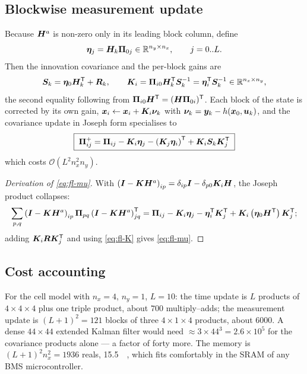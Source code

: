 \subsection{Blockwise measurement update}
Because $\bm{H}^a$ is non-zero only in its leading block column, define
\begin{equation}
\bm{\eta}_j=\bm{H}_k\bm{\Pi}_{0j}\in\mathbb{R}^{n_y\times n_x},\qquad j=0..L .
\label{eq:fl-eta}
\end{equation}
Then the innovation covariance and the per-block gains are
\begin{equation}
\bm{S}_k=\bm{\eta}_0\bm{H}_k^{\mathsf{T}}+\bm{R}_k,
\qquad
\bm{K}_i=\bm{\Pi}_{i0}\bm{H}_k^{\mathsf{T}}\bm{S}_k^{-1}=\bm{\eta}_i^{\mathsf{T}}\bm{S}_k^{-1}\in\mathbb{R}^{n_x\times n_y},
\label{eq:fl-K}
\end{equation}
the second equality following from $\bm{\Pi}_{i0}\bm{H}^{\mathsf{T}}=(\bm{H}\bm{\Pi}_{0i})^{\mathsf{T}}$.  Each block of the
state is corrected by its own gain, $\bm{x}_i\leftarrow\bm{x}_i+\bm{K}_i\bm{\nu}_k$ with
$\bm{\nu}_k=\bm{y}_k-h(\bm{x}_0,\bm{u}_k)$, and the covariance update in Joseph form specialises to
\begin{equation}
\boxed{\;\bm{\Pi}^+_{ij}=\bm{\Pi}_{ij}-\bm{K}_i\bm{\eta}_j-\left(\bm{K}_j\bm{\eta}_i\right)^{\mathsf{T}}+\bm{K}_i\bm{S}_k\bm{K}_j^{\mathsf{T}}\;}
\label{eq:fl-mu}
\end{equation}
which costs $\mathcal{O}(L^2n_x^2n_y)$.
\begin{proof}[Derivation of \eqref{eq:fl-mu}]
With $\left(\bm{I}-\bm{K}\bm{H}^a\right)_{ip}=\delta_{ip}\bm{I}-\delta_{p0}\bm{K}_i\bm{H}$, the Joseph product
collapses:
\[
\sum_{p,q}\left(\bm{I}-\bm{K}\bm{H}^a\right)_{ip}\bm{\Pi}_{pq}\left(\bm{I}-\bm{K}\bm{H}^a\right)_{jq}^{\mathsf{T}}
=\bm{\Pi}_{ij}-\bm{K}_i\bm{\eta}_j-\bm{\eta}_i^{\mathsf{T}}\bm{K}_j^{\mathsf{T}}+\bm{K}_i\left(\bm{\eta}_0\bm{H}^{\mathsf{T}}\right)\bm{K}_j^{\mathsf{T}} ;
\]
adding $\bm{K}_i\bm{R}\bm{K}_j^{\mathsf{T}}$ and using \eqref{eq:fl-K} gives \eqref{eq:fl-mu}.
\end{proof}

\subsection{Cost accounting}
For the cell model with $n_x=4$, $n_y=1$, $L=10$: the time update is $L$ products of
$4\times4\times4$ plus one triple product, about $700$ multiply--adds; the measurement update is
$(L+1)^2=121$ blocks of three $4\times1\times4$ products, about $6000$.  A dense $44\times44$
extended Kalman filter would need $\approx3\times44^3=2.6\times10^5$ for the covariance products
alone --- a factor of forty more.  The memory is $(L+1)^2n_x^2=1936$ reals, \SI{15.5}{\kilo\byte},
which fits comfortably in the SRAM of any BMS microcontroller.

